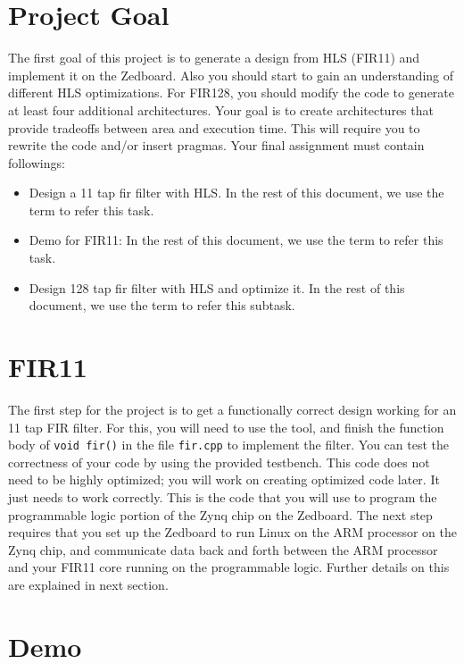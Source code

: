 \section{Project Goal}
The first goal of this project is to generate a design from HLS (FIR11) and implement it on the Zedboard.  Also you should start to gain an understanding of different HLS optimizations. For FIR128, you should modify the code to generate at least four additional architectures. Your goal is to create architectures that provide tradeoffs between area and execution time. This will require you to rewrite the code and/or insert pragmas. Your final assignment must contain followings:
\begin{itemize}
\item Design a 11 tap fir filter with HLS. In the rest of this document, we use the term  to refer this task.
\item Demo for FIR11: In the rest of this document, we use the term  to refer this task. 
\item Design 128 tap fir filter with HLS and optimize it. In the rest of this document, we use the term  to refer this subtask.
\end{itemize} 

\section{FIR11}

The first step for the project is to get a functionally correct design working for an 11 tap FIR filter. For this, you will need to use the \VHLS tool, and finish the function body of \texttt{void fir()} in the file \texttt{fir.cpp} to implement the filter. You can test the correctness of your code by using the provided testbench. This code does not need to be highly optimized; you will work on creating optimized code later. It just needs to work correctly. This is the code that you will use to program the programmable logic portion of the Zynq chip on the Zedboard. The next step requires that you set up the Zedboard to run Linux on the ARM processor on the Zynq chip, and communicate data back and forth between the ARM processor and your FIR11 core running on the programmable logic. Further details on this are explained in next section.  

\section{Demo}

